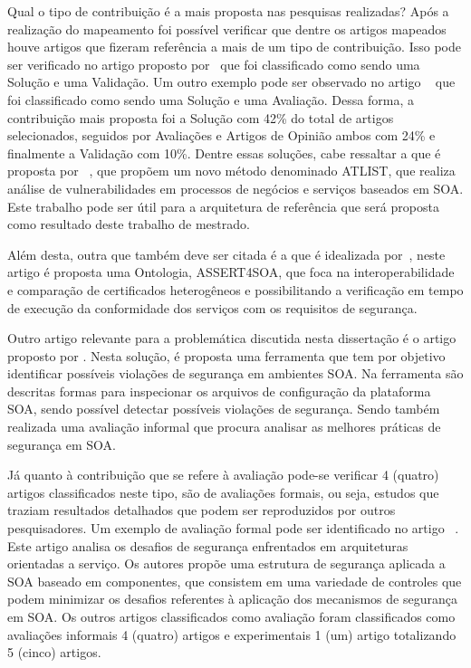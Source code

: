 Qual o tipo de contribuição é a mais proposta nas pesquisas realizadas?
Após a realização do mapeamento foi possível verificar que dentre os artigos mapeados houve artigos que fizeram referência a mais de um tipo de contribuição. Isso pode ser verificado no artigo proposto por~\cite{Delegation_Solution2011} que foi classificado como sendo uma Solução e uma Validação. Um outro exemplo pode ser observado no artigo ~\cite{Vulnerability_Analysis2011} que foi classificado  como sendo uma Solução e uma Avaliação. Dessa forma, a contribuição mais proposta foi a Solução com 42\% do total de artigos selecionados, seguidos por Avaliações e Artigos de Opinião ambos com 24\% e finalmente a Validação com 10\%. Dentre essas soluções, cabe ressaltar a que é proposta por ~\cite{Vulnerability_Analysis2011}, que propõem um novo método denominado ATLIST, que realiza análise de vulnerabilidades em processos de negócios e serviços baseados em SOA. Este trabalho pode ser útil para a arquitetura de referência que será proposta como resultado deste trabalho de mestrado.

Além desta, outra que também deve ser citada é a que é idealizada por~\cite{Ontology2012}, neste artigo é proposta uma Ontologia, ASSERT4SOA, que foca na interoperabilidade e comparação de certificados heterogêneos e possibilitando a verificação em tempo de execução da conformidade dos serviços com os requisitos de segurança.

Outro artigo relevante para a problemática discutida nesta dissertação é o artigo proposto por \cite {WeberAM07}. Nesta solução, é proposta uma ferramenta que tem por objetivo identificar possíveis violações de segurança em ambientes SOA. Na ferramenta são descritas formas para inspecionar os arquivos de configuração da plataforma SOA, sendo possível detectar possíveis violações de segurança. Sendo também realizada uma avaliação informal que procura analisar as melhores práticas de segurança em SOA.

Já quanto à contribuição que se refere à avaliação pode-se verificar 4 (quatro) artigos classificados neste tipo, são de avaliações formais, ou seja, estudos que traziam resultados detalhados que podem ser reproduzidos por outros pesquisadores. Um exemplo de avaliação formal pode ser identificado no artigo ~\cite{Coetzee2012}. Este artigo analisa os desafios de segurança enfrentados em arquiteturas orientadas a serviço. Os autores propõe uma estrutura de segurança aplicada a SOA baseado em componentes, que consistem em uma variedade de controles que podem minimizar os desafios referentes à aplicação dos mecanismos de segurança em SOA. Os outros artigos classificados como avaliação foram classificados como avaliações informais 4 (quatro) artigos e experimentais  1 (um) artigo totalizando 5 (cinco) artigos.

